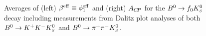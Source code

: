 \begin{figure}[htbp]
  \begin{center}
    \hfill
  \end{center}
  \vspace{-0.8cm}
  \caption{
    Averages of 
    (left) $\beta^{\rm eff} \equiv \phi_1^{\rm eff}$ and (right) $A_{C\!P}$
    for the $B^0\to f_0K^0_{\scriptscriptstyle S}$ decay including measurements from Dalitz plot analyses of both $B^0\to K^+K^-K^0_{\scriptscriptstyle S}$ and $B^0\to \pi^+\pi^-K^0_{\scriptscriptstyle S}$.
  }
  \label{fig:cp_uta:qqs:f0KS}
\end{figure}

